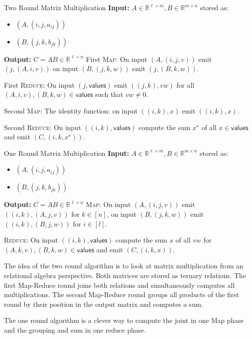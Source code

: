 \documentclass[english]{panikzettel}
\begin{document}
\begin{algo}{Two Round Matrix Multiplication}
\textbf{Input:} $A \in \mathbb{R}^{\ell \times m}, B \in \mathbb{R}^{m \times n}$ stored as:
\begin{itemize}
	\item $(A,(i,j,a_{ij}))$
	\item $(B,(j,k,b_{jk}))$
\end{itemize}

\textbf{Output:} $C = AB \in \mathbb{R}^{\ell \times n}$
\tcblower
First \textsc{Map}: On input $(A,(i,j,v))$ emit $(j,(A,i,v))$ on input $(B,(j,k,w))$ emit $(j,(B,k,w))$.

First \textsc{Reduce}: On input $(j, \textsf{values})$ emit $((j,k),vw)$ for all $(A,i,v),(B,k,w) \in \textsf{values}$ such that $vw \neq 0$.

Second \textsc{Map}: The identity function: on input $((i,k),x)$ emit $((i,k),x)$.

Second \textsc{Reduce}: On input $((i,k), \textsf{values})$ compute the sum $x^\star$ of all $x \in \textsf{values}$ and emit $(C,(i,k,x^\star))$.
\end{algo}

\begin{algo}{One Round Matrix Multiplication}
\textbf{Input:} $A \in \mathbb{R}^{\ell \times m}, B \in \mathbb{R}^{m \times n}$ stored as:
\begin{itemize}
	\item $(A,(i,j,a_{ij}))$
	\item $(B,(j,k,b_{jk}))$
\end{itemize}

\textbf{Output:} $C = AB \in \mathbb{R}^{\ell \times n}$
\tcblower
\textsc{Map}: On input $(A,(i,j,v))$ emit $((i,k),(A,j,v))$ for $k \in [n]$, on input $(B,(j,k,w))$ emit $((i,k),(B,j,w))$ for $i \in [l]$.

\textsc{Reduce}: On input $((i,k), \textsf{values})$ compute the sum $x$ of all $vw$ for $(A,k,v),(B,k,w) \in \textsf{values}$ and emit $(C,(i,k,x))$.
\end{algo}

The idea of the two round algorithm is to look at matrix multiplication from an relational algebra perspective. Both matrices are stored as ternary relations.
The first Map-Reduce round joins both relations and simultaneously computes all multiplications.
The second Map-Reduce round groups all products of the first round by their position in the output matrix and computes a sum.

The one round algorithm is a clever way to compute the joint in one Map phase and the grouping and sum in one reduce phase.
\end{document}
